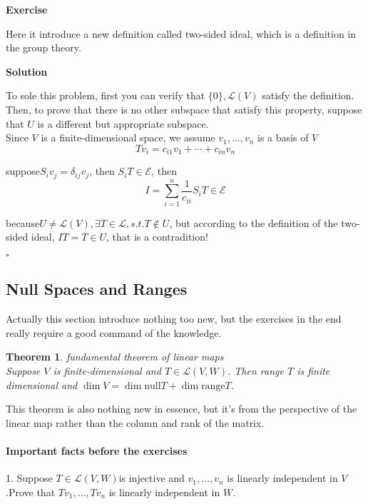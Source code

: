 \documentclass{article}
\newtheorem{theorem}{Theorem}[subsection]
\newenvironment{exercise}{%
{\textbf{Exercise\\}
    }
}{
}
\newenvironment{solution}{%
{
    \textbf{Solution\\}
    }
}{
  \hfill $\square$ 
  \par\bigskip 
}
\newcommand{\range}{\text{range}}
\newcommand{\n}{\text{null}}
\begin{document}
\begin{CJK}{UTF8}{gkai}
\begin{exercise}
Here it introduce a new definition called two-sided ideal, which is a definition in the group theory.\\
\end{exercise}

\begin{solution}
To sole this problem, first you can verify that $\{0\}, \mathcal{L}(V) $ satisfy the definition.\\

Then, to prove that there is no other subspace that satisfy this property, suppose that $U$ is a different but appropriate subspace.\\

Since $V$ is a finite-dimensional space, we assume $v_1,\ldots , v_n$ is a basis of $V$ 
\[Tv_i = c_{i1} v_1 + \cdots + c_{in} v_n\]

suppose$S_i v_j = \delta_{ij} v_j$, then $S_i T \in \mathcal{E}$, then
\[I = \sum_{i = 1}^n \dfrac{1}{c_{ii}} S_i T \in \mathcal{E}\]

because$U \neq \mathcal{L}(V), \exists T \in \mathcal{L}, s.t. T\notin U$, but according to the definition of the two-sided ideal, $IT = T \in U$, that is a contradition!
\end{solution}

\subsection{Null Spaces and Ranges}

Actually this section introduce nothing too new, but the exercises in the end really require a good command of the knowledge.

\begin{theorem}
    fundamental theorem of linear maps\\

    Suppose $V$ is finite-dimensional and  $T  \in \mathcal{L}(V,W)$. Then range $T$ is finite dimensional and $\dim V =  \dim \n T +\dim \range T$.
\end{theorem}

This theorem is also nothing new in essence, but it's from the perspective of the linear map rather than the column and rank of the matrix.\\

\paragraph{Important facts before the exercises\\}
1.  Suppose $T \in \mathcal{L}(V,W)$is injective and $v_1,\ldots,v_n$ is linearly independent in $V$.Prove that $Tv_1,\ldots,Tv_n$ is linearly independent in $W$.\\


\end{CJK}
\end{document}
